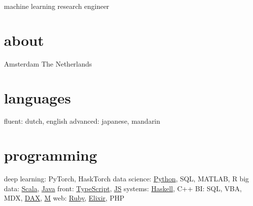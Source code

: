 \documentclass[]{friggeri-cv}
\begin{document}
       {machine learning research engineer}


\begin{aside}
\section{about}
  Amsterdam
  The Netherlands
  ~
  \section{languages}
  fluent: dutch, english
  advanced: japanese, mandarin
  \section{programming}
  deep learning: PyTorch, HaskTorch
  data science: \href{https://github.com/KiaraGrouwstra?tab=repositories\&language=python}{Python}, SQL, MATLAB, R
  big data: \href{https://github.com/KiaraGrouwstra?tab=repositories\&language=scala}{Scala}, \href{https://github.com/KiaraGrouwstra?tab=repositories\&language=java}{Java}
  front: \href{https://github.com/KiaraGrouwstra?tab=repositories\&language=typescript}{TypeScript}, \href{https://github.com/KiaraGrouwstra?tab=repositories\&language=javascript}{JS}
  systems: \href{https://github.com/KiaraGrouwstra?tab=repositories\&language=haskell}{Haskell}, C++
  BI: SQL, VBA, MDX, \href{https://powerpivotpro.com/2014/02/optimal-set-selection-power-pivot-does-pokemon-and-my-brain-just-exploded/}{DAX}, \href{https://github.com/KiaraGrouwstra/pquery}{M}
  web: \href{https://github.com/KiaraGrouwstra?tab=repositories\&language=ruby}{Ruby}, \href{https://github.com/KiaraGrouwstra?tab=repositories\&language=elixir}{Elixir}, PHP
\end{aside}
\end{document}
